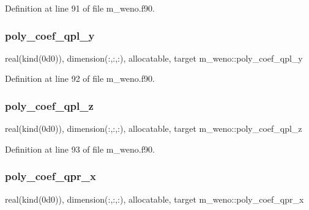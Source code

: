 Definition at line 91 of file m\+\_\+weno.\+f90.

\mbox{\label{namespacem__weno_abb402003bd3147b520a54b2ea59ca508}} 
\subsubsection{\texorpdfstring{poly\+\_\+coef\+\_\+qpl\+\_\+y}{poly\_coef\_qpl\_y}}
{\footnotesize\ttfamily real(kind(0d0)), dimension(\+:,\+:,\+:), allocatable, target m\+\_\+weno\+::poly\+\_\+coef\+\_\+qpl\+\_\+y}



Definition at line 92 of file m\+\_\+weno.\+f90.

\mbox{\label{namespacem__weno_a223297ebb5fa0e103500e55799c77e36}} 
\subsubsection{\texorpdfstring{poly\+\_\+coef\+\_\+qpl\+\_\+z}{poly\_coef\_qpl\_z}}
{\footnotesize\ttfamily real(kind(0d0)), dimension(\+:,\+:,\+:), allocatable, target m\+\_\+weno\+::poly\+\_\+coef\+\_\+qpl\+\_\+z}



Definition at line 93 of file m\+\_\+weno.\+f90.

\mbox{\label{namespacem__weno_acecc3a1f94b6dfafcf8490f29c84f17b}} 
\subsubsection{\texorpdfstring{poly\+\_\+coef\+\_\+qpr\+\_\+x}{poly\_coef\_qpr\_x}}
{\footnotesize\ttfamily real(kind(0d0)), dimension(\+:,\+:,\+:), allocatable, target m\+\_\+weno\+::poly\+\_\+coef\+\_\+qpr\+\_\+x}



